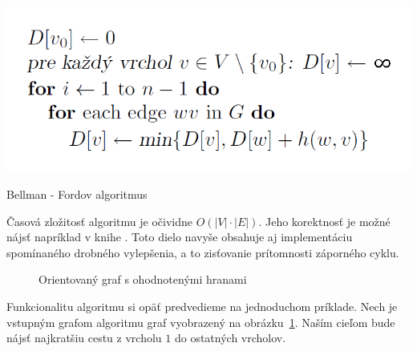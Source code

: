 \begin{algorithm}[H]
  \includegraphics[width=\linewidth]{./images/Alg_Bellman-Ford.png}
  \caption{Bellman - Fordov algoritmus}
  \label{Alg_Bellman-Ford}
  \centering
\end{algorithm}

Časová zložitosť algoritmu je očividne $O(|V|\cdot |E|)$. Jeho korektnosť je možné nájsť napríklad v knihe \cite[kapitola 3.3.4]{bang2008digraphs}. Toto dielo navyše obsahuje aj implementáciu spomínaného drobného vylepšenia, a to zisťovanie prítomnosti záporného cyklu.\newline

\begin{figure}[H]
  \caption{Orientovaný graf s ohodnotenými hranami}
  \label{bellman-ford_priklad}
\end{figure}

Funkcionalitu algoritmu si opäť predvedieme na jednoduchom príklade. Nech je vstupným grafom algoritmu graf vyobrazený na obrázku~\ref{bellman-ford_priklad}. Naším cieľom bude nájsť najkratšiu cestu z vrcholu $1$ do ostatných vrcholov.

